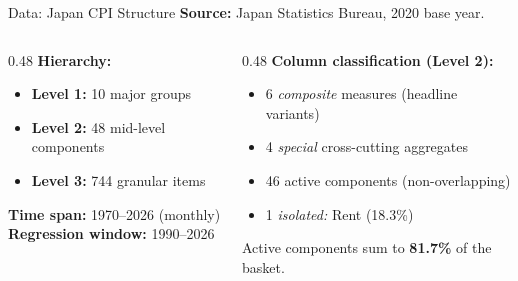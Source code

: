 \documentclass[aspectratio=169, 11pt]{beamer}
\begin{document}
\begin{frame}{Data: Japan CPI Structure}
  \textbf{Source:} Japan Statistics Bureau, 2020 base year.\\[6pt]
  \begin{columns}[T]
    \begin{column}{0.48\textwidth}
      \textbf{Hierarchy:}
      \begin{itemize}
        \item \textbf{Level 1:} 10 major groups
        \item \textbf{Level 2:} 48 mid-level components
        \item \textbf{Level 3:} 744 granular items
      \end{itemize}
      \vspace{6pt}
      \textbf{Time span:} 1970--2026 (monthly)\\
      \textbf{Regression window:} 1990--2026
    \end{column}
    \begin{column}{0.48\textwidth}
      \textbf{Column classification (Level 2):}
      \begin{itemize}
        \item 6 \emph{composite} measures (headline variants)
        \item 4 \emph{special} cross-cutting aggregates
        \item \alert{46 active components} (non-overlapping)
        \item 1 \emph{isolated:} Rent (18.3\%)
      \end{itemize}
      \vspace{6pt}
      Active components sum to \textbf{81.7\%} of the basket.
    \end{column}
  \end{columns}
\end{frame}
\end{document}
